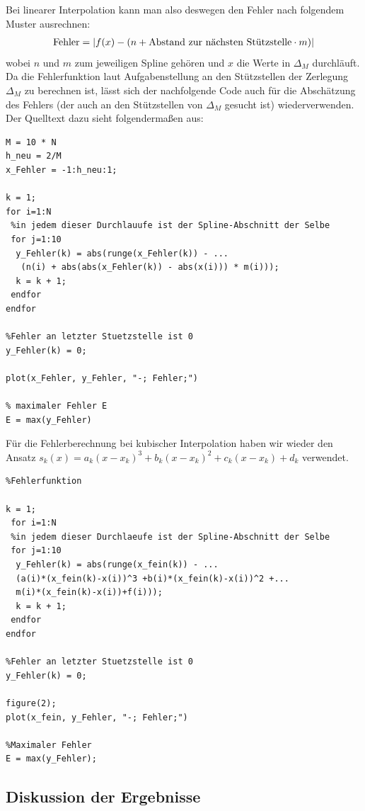 \documentclass[ngerman,a4paper]{texmf/tex/latex/mathscript/mathscript}
\begin{document}
	Bei linearer Interpolation kann man also deswegen den Fehler nach folgendem Muster ausrechnen:
	\begin{align}
		\text{Fehler} = \vert f(x) - (n + \text{Abstand zur nächsten Stützstelle}\cdot m) \vert \notag
	\end{align}
	wobei $n$ und $m$ zum jeweiligen Spline gehören und $x$ die Werte in $\Delta_M$ durchläuft. Da die Fehlerfunktion laut Aufgabenstellung an den Stützstellen der Zerlegung $\Delta_M$ zu berechnen ist, lässt sich der nachfolgende Code auch für die Abschätzung des Fehlers (der auch an den Stützstellen von $\Delta_M$ gesucht ist) wiederverwenden. Der Quelltext dazu sieht folgendermaßen aus:
\begin{lstlisting}
M = 10 * N
h_neu = 2/M
x_Fehler = -1:h_neu:1;

k = 1;
for i=1:N
 %in jedem dieser Durchlauufe ist der Spline-Abschnitt der Selbe
 for j=1:10
  y_Fehler(k) = abs(runge(x_Fehler(k)) - ...
   (n(i) + abs(abs(x_Fehler(k)) - abs(x(i))) * m(i)));
  k = k + 1;
 endfor
endfor

%Fehler an letzter Stuetzstelle ist 0
y_Fehler(k) = 0;

plot(x_Fehler, y_Fehler, "-; Fehler;")

% maximaler Fehler E
E = max(y_Fehler)
\end{lstlisting}

Für die Fehlerberechnung bei kubischer Interpolation haben wir wieder den Ansatz $s_k(x) = a_k(x-x_k)^3 + b_k(x-x_k)^2 + c_k(x-x_k) + d_k$ verwendet.
\begin{lstlisting}
%Fehlerfunktion

k = 1;
 for i=1:N
 %in jedem dieser Durchlaeufe ist der Spline-Abschnitt der Selbe
 for j=1:10
  y_Fehler(k) = abs(runge(x_fein(k)) - ...
  (a(i)*(x_fein(k)-x(i))^3 +b(i)*(x_fein(k)-x(i))^2 +...
  m(i)*(x_fein(k)-x(i))+f(i)));
  k = k + 1;
 endfor
endfor

%Fehler an letzter Stuetzstelle ist 0
y_Fehler(k) = 0;

figure(2);
plot(x_fein, y_Fehler, "-; Fehler;")

%Maximaler Fehler
E = max(y_Fehler);
\end{lstlisting}
	
	\subsection{Diskussion der Ergebnisse}
	
\end{document}
